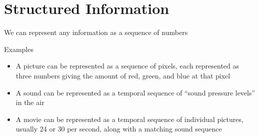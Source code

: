 \documentclass[8pt,a4paper,compress]{beamer}
\begin{document}
\section{Structured Information}
\begin{frame}[fragile]
\pause

We can represent any information as a sequence of numbers

\pause
\bigskip

Examples
\begin{itemize}
\item A picture can be represented as a sequence of pixels, each represented as three numbers giving the amount of red, green, and blue at that pixel

\item A sound can be represented as a temporal sequence of ``sound pressure levels'' in the air

\item A movie can be represented as a temporal sequence of individual pictures, usually 24 or 30 per second, along with a matching sound sequence
\end{itemize}
\end{frame}
\end{document}
